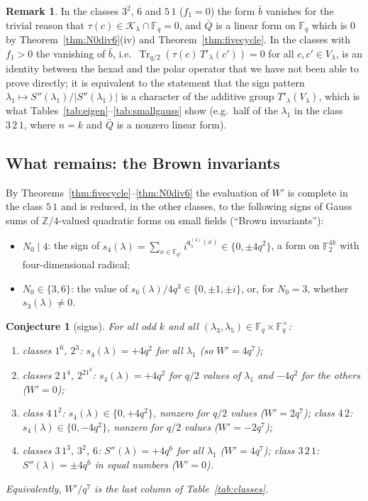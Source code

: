 ﻿\documentclass[12pt,a4paper]{amsart}
\newtheorem{conjecture}[theorem]{Conjecture}
\theoremstyle{definition}
\newtheorem{remark}[theorem]{Remark}
\newcommand{\F}{\mathbb{F}}
\newcommand{\Z}{\mathbb{Z}}
\newcommand{\Tr}{\operatorname{Tr}}
\newcommand{\Kk}{\mathcal{K}}
\newcommand{\qq}{\mathfrak{q}}
\newcommand{\Spp}{S''}
\begin{document}
\begin{remark}
In the classes $3^2$, $6$ and $5\,1$ ($f_1=0$) the form $\bar b$ vanishes for the trivial reason that $\tau(c)\in\Kk_\lambda\cap\F_q=0$, and $\bar Q$ is a linear form on $\F_q$ which is $0$ by Theorem~\ref{thm:N0div6}(iv) and Theorem~\ref{thm:fivecycle}. In the classes with $f_1>0$ the vanishing of $\bar b$, i.e.\ $\Tr_{q/2}(\tau(c)\,T'_\lambda(c'))=0$ for all $c,c'\in V_\lambda$, is an identity between the hexad and the polar operator that we have not been able to prove directly; it is equivalent to the statement that the sign pattern $\lambda_1\mapsto\Spp(\lambda_1)/|\Spp(\lambda_1)|$ is a character of the additive group $T'_\lambda(V_\lambda)$, which is what Tables~\ref{tab:eigen}--\ref{tab:smallgauss} show (e.g.\ half of the $\lambda_1$ in the class $3\,2\,1$, where $n=k$ and $\bar Q$ is a nonzero linear form).
\end{remark}

\subsection{What remains: the Brown invariants}\label{subsec:remains}
By Theorems~\ref{thm:fivecycle}--\ref{thm:N0div6} the evaluation of $W'$ is complete in the class $5\,1$ and is reduced, in the other classes, to the following signs of Gauss sums of $\Z/4$-valued quadratic forms on small fields (``Brown invariants''):
\begin{itemize}[leftmargin=2em]
\item $N_0\mid4$: the sign of $s_4(\lambda)=\sum_{x\in\F_{q^4}}i^{\qq^{(4)}_\lambda(x)}\in\{0,\pm4q^2\}$, a form on $\F_2^{4k}$ with four-dimensional radical;
\item $N_0\in\{3,6\}$: the value of $s_6(\lambda)/4q^3\in\{0,\pm1,\pm i\}$, or, for $N_0=3$, whether $s_3(\lambda)\ne0$.
\end{itemize}

\begin{conjecture}[signs]\label{conj:signs}
For all odd $k$ and all $(\lambda_3,\lambda_5)\in\F_q\times\F_q^\times$:
\begin{enumerate}[label=\textup{(\roman*)},leftmargin=2em]
\item classes $1^6$, $2^3$: $s_4(\lambda)=+4q^2$ for all $\lambda_1$ (so $W'=4q^7$);
\item classes $2\,1^4$, $2^21^2$: $s_4(\lambda)=+4q^2$ for $q/2$ values of $\lambda_1$ and $-4q^2$ for the others ($W'=0$);
\item class $4\,1^2$: $s_4(\lambda)\in\{0,+4q^2\}$, nonzero for $q/2$ values ($W'=2q^7$); class $4\,2$: $s_4(\lambda)\in\{0,-4q^2\}$, nonzero for $q/2$ values ($W'=-2q^7$);
\item classes $3\,1^3$, $3^2$, $6$: $\Spp(\lambda)=+4q^6$ for all $\lambda_1$ ($W'=4q^7$); class $3\,2\,1$: $\Spp(\lambda)=\pm4q^6$ in equal numbers ($W'=0$).
\end{enumerate}
Equivalently, $W'/q^7$ is the last column of Table~\ref{tab:classes}.
\end{conjecture}
\end{document}
